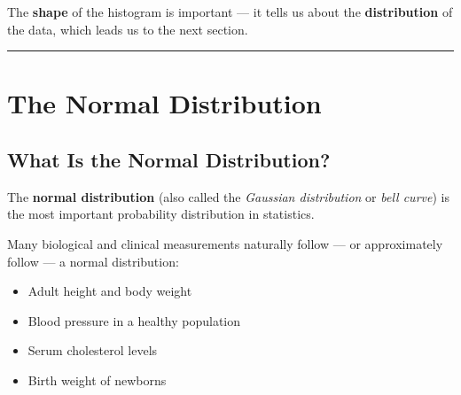 \documentclass[
  12pt,
  letterpaper,
]{book}
\providecommand{\tightlist}{%
  \setlength{\itemsep}{0pt}\setlength{\parskip}{0pt}}
\begin{document}
The \textbf{shape} of the histogram is important --- it tells us about
the \textbf{distribution} of the data, which leads us to the next
section.

\begin{center}\rule{0.5\linewidth}{0.5pt}\end{center}


\chapter{The Normal Distribution}\label{the-normal-distribution}

\section{What Is the Normal
Distribution?}\label{what-is-the-normal-distribution}

The \textbf{normal distribution} (also called the \emph{Gaussian
distribution} or \emph{bell curve}) is the most important probability
distribution in statistics.

Many biological and clinical measurements naturally follow --- or
approximately follow --- a normal distribution:

\begin{itemize}
\tightlist
\item
  Adult height and body weight
\item
  Blood pressure in a healthy population
\item
  Serum cholesterol levels
\item
  Birth weight of newborns
\end{itemize}
\end{document}
